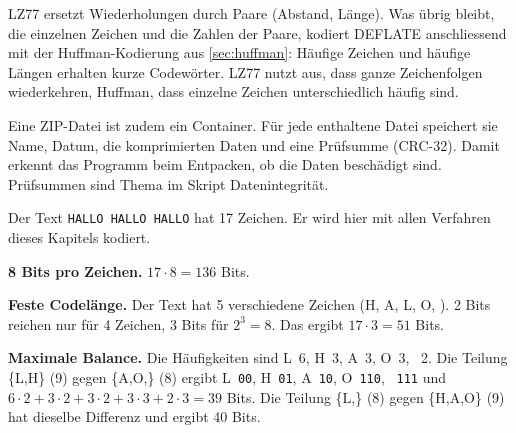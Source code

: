 LZ77 ersetzt Wiederholungen durch Paare (Abstand, Länge). Was übrig bleibt, die einzelnen Zeichen und die Zahlen der Paare, kodiert DEFLATE anschliessend mit der Huffman-Kodierung aus \cref{sec:huffman}: Häufige Zeichen und häufige Längen erhalten kurze Codewörter. LZ77 nutzt aus, dass ganze Zeichenfolgen wiederkehren, Huffman, dass einzelne Zeichen unterschiedlich häufig sind.

Eine ZIP-Datei ist zudem ein Container. Für jede enthaltene Datei speichert sie Name, Datum, die komprimierten Daten und eine Prüfsumme (CRC-32). Damit erkennt das Programm beim Entpacken, ob die Daten beschädigt sind. Prüfsummen sind Thema im Skript Datenintegrität.

\begin{myexample}\label{ex:deflate-hallo}
	Der Text \texttt{HALLO HALLO HALLO} hat 17 Zeichen. Er wird hier mit allen Verfahren dieses Kapitels kodiert.

	\textbf{8 Bits pro Zeichen.} $17 \cdot 8 = 136$ Bits.

	\textbf{Feste Codelänge.} Der Text hat 5 verschiedene Zeichen (H, A, L, O, \textvisiblespace). 2 Bits reichen nur für 4 Zeichen, 3 Bits für $2^3 = 8$. Das ergibt $17 \cdot 3 = 51$ Bits.

	\textbf{Maximale Balance.} Die Häufigkeiten sind L~6, H~3, A~3, O~3, \textvisiblespace~2. Die Teilung \{L,H\} (9) gegen \{A,O,\textvisiblespace\} (8) ergibt L~\texttt{00}, H~\texttt{01}, A~\texttt{10}, O~\texttt{110}, \textvisiblespace~\texttt{111} und $6\cdot2 + 3\cdot2 + 3\cdot2 + 3\cdot3 + 2\cdot3 = 39$ Bits. Die Teilung \{L,\textvisiblespace\} (8) gegen \{H,A,O\} (9) hat dieselbe Differenz und ergibt 40 Bits.


\end{myexample}

